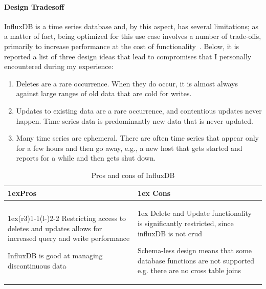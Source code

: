 \paragraph{Design Tradesoff}
InfluxDB is a time series database and, by this aspect, has several limitations; as a matter of fact,
being optimized for this use case involves a number of trade-offs, primarily to increase performance at the cost of functionality~\cite{Misc:influx_docs}.
Below, it is reported a list of three design ideas that lead to compromises that I personally encountered during my experience:
\begin{enumerate}
    \item Deletes are a rare occurrence. When they do occur, it is almost always against large ranges of old data that are cold for writes.
    \item Updates to existing data are a rare occurrence, and contentious updates never happen. Time series data is predominantly new data that is never updated.
    \item Many time series are ephemeral. There are often time series that appear only for a few hours and then go away, e.g., a new host that gets started and reports for a while and then gets shut down.
\end{enumerate}
\begin{table}[ht]
    \begin{tabularx}{\linewidth}{>{\parskip1ex}X@{\kern4\tabcolsep}>{\parskip1ex}X}
        \toprule
        \hfil\bfseries Pros
        &
        \hfil\bfseries Cons
        \\\cmidrule(r{3\tabcolsep}){1-1}\cmidrule(l{-\tabcolsep}){2-2}
        Restricting access to deletes and updates allows for increased query and write performance\par
        InfluxDB is good at managing discontinuous data\par
        &
        Delete and Update functionality is significantly restricted, since influxDB is not \acs{crud} \par
        Schema-less design means that some database functions are not supported e.g. there are no cross table joins\par
        \\\bottomrule
    \end{tabularx}
    \caption{Pros and cons of InfluxDB}
\end{table}

